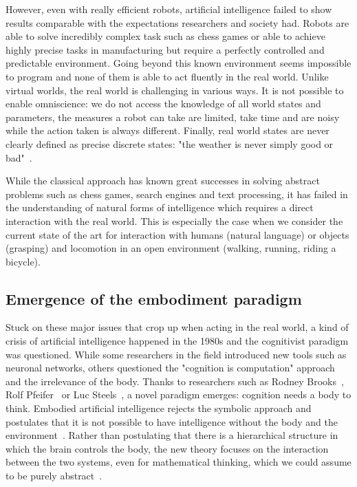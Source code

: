 However, even with really efficient robots, artificial intelligence failed to show results comparable with the expectations researchers and society had. Robots are able to solve incredibly complex task such as chess games or able to achieve highly precise tasks in manufacturing but require a perfectly controlled and predictable environment. Going beyond this known environment seems impossible to program and none of them is able to act fluently in the real world.
Unlike virtual worlds, the real world is challenging in various ways. It is not possible to enable omniscience: we do not access the knowledge of all world states and parameters, the measures a robot can take are limited, take time and are noisy while the action taken is always different. Finally, real world states are never clearly defined as precise discrete states: "the weather is never simply good or bad"~\parencite{Pfeifer06}.

While the classical approach has known great successes  in solving abstract problems such as chess games, search engines and text processing, it has failed in the understanding of natural forms of intelligence which requires a direct interaction with the real world. This is especially the case when we consider the current state of the art for interaction with humans (natural language) or objects (grasping) and locomotion in an open environment (walking, running, riding a bicycle).

\subsection{Emergence of the embodiment paradigm} %

Stuck on these major issues that crop up when acting in the real world, a kind of crisis of artificial intelligence happened in the 1980s and the cognitivist paradigm was questioned. While some researchers in the field introduced new tools such as neuronal networks, others questioned the "cognition is computation" approach and the irrelevance of the body.
Thanks to researchers such as Rodney Brooks~\parencite{brooks1986achieving}, Rolf Pfeifer~\parencite{pfeifer2001understanding} or Luc Steels~\parencite{steels1995artificial}, a novel paradigm emerges: cognition needs a body to think. Embodied artificial intelligence rejects the symbolic approach and postulates that it is not possible to have intelligence without the body and the environment~\parencite{pfeifer2001understanding}. Rather than postulating that there is a hierarchical structure in which the brain controls the body, the new theory focuses on the interaction between the two systems, even for mathematical thinking, which we could assume to be purely abstract~\parencite{lakoff2000mathematics}.

